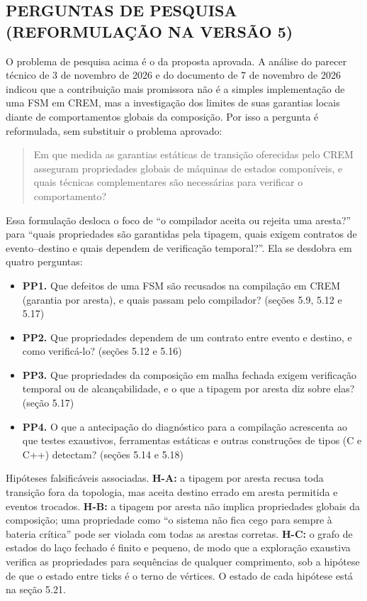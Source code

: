\documentclass[12pt,a4paper]{article}
\begin{document}
\subsection{PERGUNTAS DE PESQUISA (REFORMULAÇÃO NA VERSÃO 5)}
\label{sec:rq}

O problema de pesquisa acima é o da proposta aprovada. A análise do parecer técnico de 3 de novembro de 2026 e do documento de 7 de novembro de 2026 indicou que a contribuição mais promissora não é a simples implementação de uma FSM em CREM, mas a investigação dos limites de suas garantias locais diante de comportamentos globais da composição. Por isso a pergunta é reformulada, sem substituir o problema aprovado:

\begin{quote}
   Em que medida as garantias estáticas de transição oferecidas pelo CREM asseguram propriedades globais de máquinas de estados componíveis, e quais técnicas complementares são necessárias para verificar o comportamento?
\end{quote}

Essa formulação desloca o foco de ``o compilador aceita ou rejeita uma aresta?'' para ``quais propriedades são garantidas pela tipagem, quais exigem contratos de evento--destino e quais dependem de verificação temporal?''. Ela se desdobra em quatro perguntas:

\begin{itemize}
\item \textbf{PP1.} Que defeitos de uma FSM são recusados na compilação em CREM (garantia por aresta), e quais passam pelo compilador? (seções 5.9, 5.12 e 5.17)
\item \textbf{PP2.} Que propriedades dependem de um contrato entre evento e destino, e como verificá-lo? (seções 5.12 e 5.16)
\item \textbf{PP3.} Que propriedades da composição em malha fechada exigem verificação temporal ou de alcançabilidade, e o que a tipagem por aresta diz sobre elas? (seção 5.17)
\item \textbf{PP4.} O que a antecipação do diagnóstico para a compilação acrescenta ao que testes exaustivos, ferramentas estáticas e outras construções de tipos (C e C++) detectam? (seções 5.14 e 5.18)
\end{itemize}

Hipóteses falsificáveis associadas. \textbf{H-A:} a tipagem por aresta recusa toda transição fora da topologia, mas aceita destino errado em aresta permitida e eventos trocados. \textbf{H-B:} a tipagem por aresta não implica propriedades globais da composição; uma propriedade como ``o sistema não fica cego para sempre à bateria crítica'' pode ser violada com todas as arestas corretas. \textbf{H-C:} o grafo de estados do laço fechado é finito e pequeno, de modo que a exploração exaustiva verifica as propriedades para sequências de qualquer comprimento, sob a hipótese de que o estado entre ticks é o terno de vértices. O estado de cada hipótese está na seção 5.21.
\end{document}
